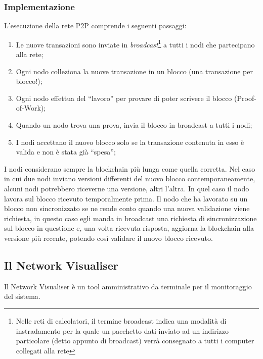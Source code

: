 \subsubsection{Implementazione}
L'esecuzione della rete P2P comprende i seguenti passaggi:
\begin{enumerate}
    \item Le nuove transazioni sono inviate in \textit{broadcast}\footnote{Nelle reti di calcolatori, il termine broadcast indica una modalità di instradamento per la quale un pacchetto dati inviato ad un indirizzo particolare (detto appunto di broadcast) verrà consegnato a tutti i computer collegati alla rete} a tutti i nodi che partecipano alla rete;
    \item Ogni nodo colleziona la nuove transazione in un blocco (una transazione per blocco!);
    \item Ogni nodo effettua del ``lavoro'' per provare di poter scrivere il blocco (Proof-of-Work);
    \item Quando un nodo trova una prova, invia il blocco in broadcast a tutti i nodi;
    \item I nodi accettano il nuovo blocco solo se la transazione contenuta in esso è valida e non è stata già ``spesa'';
\end{enumerate}

I nodi considerano sempre la blockchain più lunga come quella corretta. Nel caso in cui due nodi inviano versioni differenti del nuovo blocco contemporaneamente, alcuni nodi potrebbero riceverne  una versione, altri l'altra. In quel caso il nodo lavora sul blocco ricevuto temporalmente prima. Il nodo che ha lavorato su un blocco non sincronizzato se ne rende conto quando una nuova validazione viene richiesta, in questo caso egli manda in broadcast una richiesta di sincronizzazione sul blocco in questione e, una volta ricevuta risposta, aggiorna la blockchain alla versione più recente, potendo così validare il nuovo blocco ricevuto.

\subsection{Il Network Visualiser}
Il Network Visualiser è un tool amministrativo da terminale per il monitoraggio del sistema.

